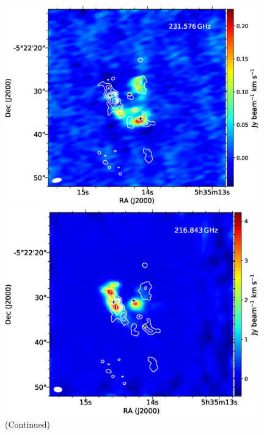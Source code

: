 \begin{figure}[H]
\begin{center}
\begin{minipage}{0.98\textwidth} 
\begin{center}
\begin{minipage}{0.48\textwidth}
\begin{center}
\includegraphics[width=0.98\textwidth]{OrionKL/mom0/231.576mom0_3-7.eps}
\end{center}
\end{minipage}
\begin{minipage}{0.48\textwidth}
\begin{center}
\includegraphics[width=0.98\textwidth]{OrionKL/mom0/216.843mom0_3-7.eps}
\end{center}
\end{minipage}
\end{center}
\end{minipage}
\caption{(Continued)}
\end{center}
\end{figure}

